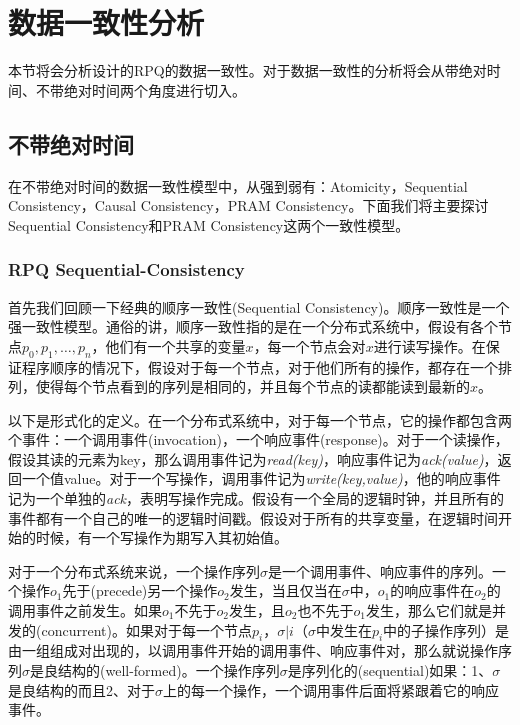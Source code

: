 \section{数据一致性分析}
	\label{section:analysis}
	\par 本节将会分析设计的RPQ的数据一致性。对于数据一致性的分析将会从带绝对时间、不带绝对时间两个角度进行切入。
	\subsection{不带绝对时间}
		\par 在不带绝对时间的数据一致性模型中，从强到弱有：Atomicity，Sequential Consistency，Causal Consistency，PRAM Consistency\cite{Steinke:2004:UTS:1017460.1017464}。下面我们将主要探讨Sequential Consistency和PRAM Consistency这两个一致性模型。
		\subsubsection{RPQ Sequential-Consistency}
			\par 首先我们回顾一下经典的顺序一致性(Sequential Consistency)\cite{lamport1979make}\cite{Attiya:1994:SCV:176575.176576}\cite{attiya2004distributed}。顺序一致性是一个强一致性模型。通俗的讲，顺序一致性指的是在一个分布式系统中，假设有各个节点$p_0,p_1,\dots,p_n$，他们有一个共享的变量$x$，每一个节点会对$x$进行读写操作。在保证程序顺序的情况下，假设对于每一个节点，对于他们所有的操作，都存在一个排列，使得每个节点看到的序列是相同的，并且每个节点的读都能读到最新的$x$。
			\par 以下是形式化的定义。在一个分布式系统中，对于每一个节点，它的操作都包含两个事件：一个调用事件(invocation)，一个响应事件(response)。对于一个读操作，假设其读的元素为key，那么调用事件记为\textit{read(key)}，响应事件记为\textit{ack(value)}，返回一个值value。对于一个写操作，调用事件记为\textit{write(key,value)}，他的响应事件记为一个单独的\textit{ack}，表明写操作完成。假设有一个全局的逻辑时钟，并且所有的事件都有一个自己的唯一的逻辑时间戳。假设对于所有的共享变量，在逻辑时间开始的时候，有一个写操作为期写入其初始值。
			\par 对于一个分布式系统来说，一个操作序列$\sigma$是一个调用事件、响应事件的序列。一个操作$o_1$先于(precede)另一个操作$o_2$发生，当且仅当在$\sigma$中，$o_1$的响应事件在$o_2$的调用事件之前发生。如果$o_1$不先于$o_2$发生，且$o_2$也不先于$o_1$发生，那么它们就是并发的(concurrent)。如果对于每一个节点$p_i$，$\sigma |i$（$\sigma$中发生在$p_i$中的子操作序列）是由一组组成对出现的，以调用事件开始的调用事件、响应事件对，那么就说操作序列$\sigma$是良结构的(well-formed)。一个操作序列$\sigma$是序列化的(sequential)如果：1、$\sigma$是良结构的而且2、对于$\sigma$上的每一个操作，一个调用事件后面将紧跟着它的响应事件。
